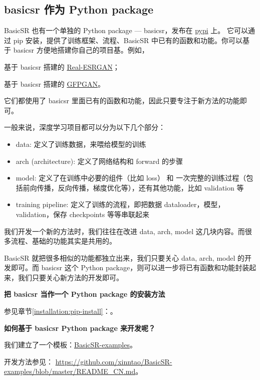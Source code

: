 \documentclass[../main.tex]{subfiles}
\begin{document}
\subsection{basicsr 作为 Python package}\label{overview:package}

BasicSR 也有一个单独的 Python package --- basicsr，发布在 \href{https://pypi.org/project/basicsr}{pypi} 上。
它可以通过 pip 安装，提供了训练框架、流程、BasicSR 中已有的函数和功能。你可以基于 basicsr 方便地搭建你自己的项目基。例如，

\centerline{基于 basicsr 搭建的 \href{https://github.com/xinntao/Real-ESRGAN}{Real-ESRGAN}；}
\centerline{基于 basicsr 搭建的 \href{https://github.com/TencentARC/GFPGAN}{GFPGAN}。}

它们都使用了 basicsr 里面已有的函数和功能，因此只要专注于新方法的功能即可。

一般来说，深度学习项目都可以分为以下几个部分：
\begin{itemize}
    \item data: 定义了训练数据，来喂给模型的训练
    \item arch (architecture): 定义了网络结构和 forward 的步骤
    \item model: 定义了在训练中必要的组件（比如 loss） 和 一次完整的训练过程（包括前向传播，反向传播，梯度优化等），还有其他功能，比如 validation 等
    \item training pipeline: 定义了训练的流程，即把数据 dataloader，模型，validation，保存 checkpoints 等等串联起来
\end{itemize}

我们开发一个新的方法时，我们往往在改进 data, arch, model 这几块内容。而很多流程、基础的功能其实是共用的。

BasicSR 就把很多相似的功能都独立出来，我们只要关心 data, arch, model 的开发即可。而 basicsr 这个 Python package，则可以进一步将已有函数和功能封装起来，我们只要关心新方法的开发即可。

\begin{note} %
    \textbf{把 basicsr 当作一个 Python package 的安装方法}

    参见章节\ref{installation:pip-install}：。
\end{note}

\textbf{}

\begin{note} %
    \textbf{如何基于 basicsr Python package 来开发呢？}

    我们建立了一个模板：\href{https://github.com/xinntao/BasicSR-examples}{BasicSR-examples}。

    开发方法参见： \url{https://github.com/xinntao/BasicSR-examples/blob/master/README_CN.md}。
\end{note}
\end{document}
